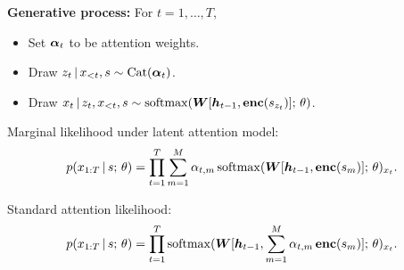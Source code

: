 \begin{frame}


\textbf{Generative process:} For $t=1, \ldots, T$,
\begin{itemize}
    \item Set $\boldsymbol{\alpha}_t$ to be attention weights.
    \item Draw $z_{t} \,|\, x_{ < t}, s \sim \mathrm{Cat}(\boldsymbol{\alpha}_t)$.
    \item Draw $x_{t} \,|\, z_{t}, x_{< t}, s \sim \operatorname*{softmax}(\boldsymbol{W} [\boldsymbol{h}_{t-1}, \boldsymbol{\mathrm{enc}}(s_{z_{t}})] ; \, \theta)$.
\end{itemize}

\end{frame}

\begin{frame}
Marginal likelihood under latent attention model:
    \begin{align*}
       p(x_{1:T} \,|\, s ; \, \theta) = \prod_{t=1}^T \sum_{m=1}^M \alpha_{t,m} \operatorname*{softmax}(\boldsymbol{W} [\boldsymbol{h}_{t-1}, \boldsymbol{\mathrm{enc}}(s_{m})] ; \, \theta)_{x_t}.
    \end{align*}
    
\air
\air
\air
\air

Standard attention likelihood:
    \begin{align*}
        p(x_{1:T} \,|\, s ; \, \theta) = \prod_{t=1}^T  \operatorname*{softmax}(\boldsymbol{W} [\boldsymbol{h}_{t-1}, \sum_{m=1}^M \alpha_{t,m} \, \boldsymbol{\mathrm{enc}}(s_{m})] ; \, \theta)_{x_t}.
    \end{align*}
    
\end{frame}

